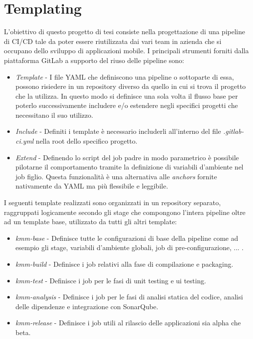 \section{Templating}
L'obiettivo di questo progetto di tesi consiste nella progettazione di una pipeline di CI/CD tale da poter essere riutilizzata dai vari team in azienda che si occupano dello sviluppo di applicazioni mobile. I principali strumenti forniti dalla piattaforma GitLab a supporto del riuso delle pipeline sono:
\begin{itemize}
    \item \textit{Template} - I file YAML che definiscono una pipeline o sottoparte di essa, possono risiedere in un repository diverso da quello in cui si trova il progetto che la utilizza. In questo modo si definisce una sola volta il flusso base per poterlo successivamente includere e/o estendere negli specifici progetti che necessitano il suo utilizzo.
    \item \textit{Include} - Definiti i template è necessario includerli all'interno del file \textit{.gitlab-ci.yml} nella root dello specifico progetto.
    \item \textit{Extend} - Definendo lo script del job padre in modo parametrico è possibile pilotarne il comportamento tramite la definizione di variabili d'ambiente nel job figlio. Questa funzionalità è una alternativa alle \textit{anchors} fornite nativamente da YAML ma più flessibile e leggibile. 
\end{itemize}

I seguenti template realizzati sono organizzati in un repository separato, raggruppati logicamente secondo gli stage che compongono l'intera pipeline oltre ad un template base, utilizzato da tutti gli altri template:
\begin{itemize}
    \item \textit{kmm-base} - Definisce tutte le configurazioni di base della pipeline come ad esempio gli stage, variabili d'ambiente globali, job di pre-configurazione, ... .
    \item \textit{kmm-build} - Definisce i job relativi alla fase di compilazione e packaging.
    \item \textit{kmm-test} - Definisce i job per le fasi di unit testing e ui testing.
    \item \textit{kmm-analysis} - Definisce i job per le fasi di analisi statica del codice, analisi delle dipendenze e integrazione con SonarQube.
    \item \textit{kmm-release} - Definisce i job utili al rilascio delle applicazioni sia alpha che beta.
\end{itemize}

